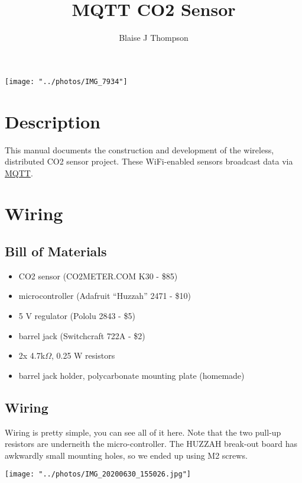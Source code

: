 \documentclass{manual}
\title{MQTT CO2 Sensor}
\author{Blaise J Thompson}
\begin{document}
\maketitle

\vspace*{\fill}

\texttt{[image: "../photos/IMG\_7934"]}

\vspace*{\fill}


\section{Description}

This manual documents the construction and development of the wireless, distributed CO2 sensor project.
These WiFi-enabled sensors broadcast data via \href{https://mqtt.org/}{MQTT}.

\section{Wiring}

\subsection{Bill of Materials}

\begin{itemize}
  \item CO2 sensor (CO2METER.COM K30 - \$85)
  \item microcontroller (Adafruit ``Huzzah'' 2471 - \$10)
  \item 5 V regulator (Pololu 2843 - \$5)
  \item barrel jack (Switchcraft 722A - \$2)
  \item 2x 4.7k$\Omega$, 0.25 W resistors
  \item barrel jack holder, polycarbonate mounting plate (homemade)
\end{itemize}

\subsection{Wiring}

Wiring is pretty simple, you can see all of it here.
Note that the two pull-up resistors are underneith the micro-controller.
The HUZZAH break-out board has awkwardly small mounting holes, so we ended up using M2 screws.

\texttt{[image: "../photos/IMG\_20200630\_155026.jpg"]}
\end{document}
